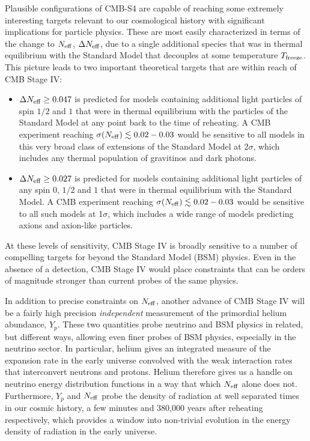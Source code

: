 Plausible configurations of CMB-S4 are capable of reaching some extremely interesting targets relevant to our cosmological history with significant implications for particle physics. These are most easily characterized in terms of the change to $N_{\rm eff}$, $\Delta N_{\rm eff}$, due to a single additional species that was in thermal equilibrium with the Standard Model that decouples at some temperature $T_{\rm freeze}$.  This picture leads to two important theoretical targets that are within reach of CMB Stage IV:
\begin{itemize}
\item $\Delta N_{\rm eff} \geq 0.047$ is predicted for models containing additional light particles of spin $1/2$ and $1$ that were in thermal equilibrium with the particles of the Standard Model at any point back to the time of reheating.  A CMB experiment reaching $\sigma(N_{\rm eff}) \lesssim 0.02-0.03$ would be sensitive to all models in this very broad class of extensions of the Standard Model at 2$\sigma$, which includes any thermal population of gravitinos and dark photons.  %
\item $\Delta N_{\rm eff} \geq  0.027$ is predicted for models containing additional light particles of any spin $0$, $1/2$ and $1$ that were in thermal equilibrium with the Standard Model.  A CMB experiment reaching $\sigma(N_{\rm eff}) \lesssim 0.02-0.03$ would be sensitive to all such models at 1$\sigma$, which includes a wide range of models predicting axions and axion-like particles. 
\end{itemize}
At these levels of sensitivity, CMB Stage IV is broadly sensitive to a number of compelling targets for beyond the Standard Model (BSM) physics.  Even in the absence of a detection, CMB Stage IV would place constraints that can be orders of magnitude stronger than current probes of the same physics.

In addition to precise constraints on $N_{\rm eff}$, another advance of CMB Stage IV will be a fairly high precision {\it independent} measurement of the primordial helium abundance, $Y_p$. These two quantities probe neutrino and BSM physics in related, but different ways, allowing even finer probes of BSM physics, especially in the neutrino sector.  In particular, helium gives an integrated measure of the expansion rate in the early universe convolved with the weak interaction rates that interconvert neutrons and protons. Helium therefore gives us a handle on neutrino energy distribution functions in a way that which $N_{\rm eff}$ alone does not.  Furthermore, $Y_p$ and $N_{\rm eff}$ probe the density of radiation at well separated times in our cosmic history, a few minutes and 380,000 years after reheating respectively, which provides a window into non-trivial evolution in the energy density of radiation in the early universe.  

